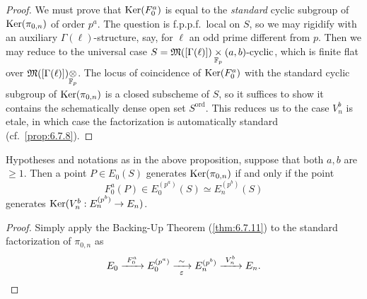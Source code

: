 \begin{proof}
We must prove that $\operatorname{Ker}(F_0^a)$ is equal to the \emph{standard} cyclic subgroup of $\operatorname{Ker}(\pi_{0,n})$ of order $p^a$. The question is f.p.p.f.\ local on $S$, so we may rigidify with an auxiliary $\Gamma(\ell)$-structure, say, for $\ell$ an odd prime different from $p$. Then we may reduce to the universal case $S = \mathfrak{M}([\Gamma(\ell)]) \underset{\mathbb{F}_p}{\times} (a,b)\text{-\rm cyclic}$, which is finite flat over $\mathfrak{M}([\Gamma(\ell)]) \underset{\mathbb{F}_p}{\otimes}$. The locus of coincidence of $\operatorname{Ker}(F_0^a)$ with the standard cyclic subgroup of $\operatorname{Ker}(\pi_{0,n})$ is a closed subscheme of $S$, so it suffices to show it contains the schematically dense open set $S^{\mathrm{ord}}$. This reduces us to the case $V_n^b$ is etale, in which case the factorization is automatically standard (cf.~\ref{prop:6.7.8}).
\end{proof}

\begin{kcor}\label{cor:13.5.2}
Hypotheses and notations as in the above proposition, suppose that both $a, b$ are $\ge 1$. Then a point $P \in E_0(S)$ generates $\operatorname{Ker}(\pi_{0,n})$ if and only if the point
\[
F_0^a(P) \in E_0^{(p^a)}(S) \simeq E_n^{(p^b)}(S)
\]
generates $\operatorname{Ker}(V_n^b : E_n^{(p^b)} \to E_n)$.
\end{kcor}

\begin{proof}
Simply apply the Backing-Up Theorem (\ref{thm:6.7.11}) to the standard factorization of $\pi_{0,n}$ as
\[
E_0 \xrightarrow{\ F_0^a\ } E_0^{(p^a)} \xrightarrow[\varepsilon]{\ \sim\ } E_n^{(p^b)} \xrightarrow{\ V_n^b\ } E_n . \qedhere
\]
\end{proof}

